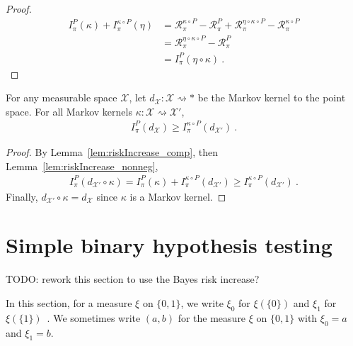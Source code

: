 \begin{proof}\leanok
\uses{}
\begin{align*}
I^P_\pi(\kappa) + I^{\kappa \circ P}_\pi(\eta)
&= \mathcal R^{\kappa \circ P}_\pi - \mathcal R^{P}_\pi + \mathcal R^{\eta \circ \kappa \circ P}_\pi - \mathcal R^{\kappa \circ P}_\pi
\\
&= \mathcal R^{\eta \circ \kappa \circ P}_\pi - \mathcal R^{P}_\pi
\\
&= I^P_\pi(\eta \circ \kappa)
\: .
\end{align*}
\end{proof}

\begin{lemma}
  \label{lem:riskIncrease_comp_del}
  \leanok
  For any measurable space $\mathcal X$, let $d_{\mathcal X} : \mathcal X \rightsquigarrow *$ be the Markov kernel to the point space.
  For all Markov kernels $\kappa : \mathcal X \rightsquigarrow \mathcal X'$,
  \begin{align*}
  I_\pi^P(d_{\mathcal X}) \ge I_\pi^{\kappa \circ P}(d_{\mathcal X'}) \: .
  \end{align*}
\end{lemma}

\begin{proof}\leanok
{}
By Lemma~\ref{lem:riskIncrease_comp}, then Lemma~\ref{lem:riskIncrease_nonneg},
\begin{align*}
I_\pi^P(d_{\mathcal X'} \circ \kappa)
= I^P_\pi(\kappa) + I^{\kappa \circ P}_\pi(d_{\mathcal X'})
\ge I_\pi^{\kappa \circ P}(d_{\mathcal X'})
\: .
\end{align*}
Finally, $d_{\mathcal X'} \circ \kappa = d_{\mathcal X}$ since $\kappa$ is a Markov kernel.
\end{proof}




\section{Simple binary hypothesis testing}

TODO: rework this section to use the Bayes risk increase?

In this section, for a measure $\xi$ on $\{0,1\}$, we write $\xi_0$ for $\xi(\{0\})$ and $\xi_1$ for $\xi(\{1\})$~. We sometimes write $(a,b)$ for the measure $\xi$ on $\{0,1\}$ with $\xi_0 = a$ and $\xi_1 = b$.


